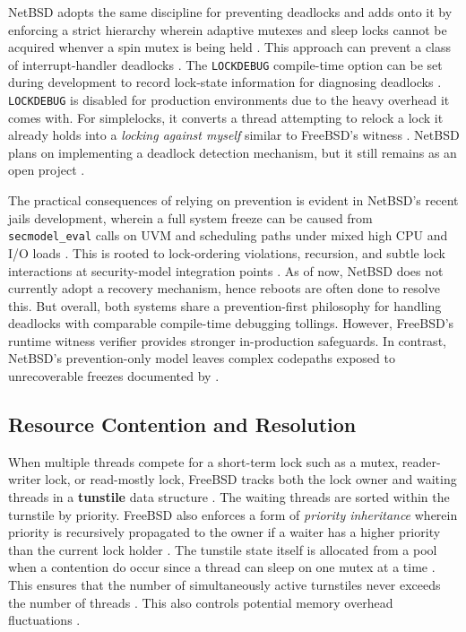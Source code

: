 NetBSD adopts the same discipline for preventing deadlocks and adds onto it by enforcing a strict hierarchy wherein adaptive mutexes
and sleep locks cannot be acquired whenver a spin mutex is being held \parencite{netbsd_mutex}. This approach can prevent a class
of interrupt-handler deadlocks \parencite{netbsd_mutex}. The \texttt{LOCKDEBUG} compile-time option can be set during development
to record lock-state information for diagnosing deadlocks \parencite{netbsd_lock}. \texttt{LOCKDEBUG} is disabled for production
environments due to the heavy overhead it comes with. For simplelocks, it converts a thread attempting
to relock a lock it already holds into a \textit{locking against myself} similar to FreeBSD's witness \parencite{netbsd_lockmgr}.
NetBSD plans on implementing a deadlock detection mechanism, but it still remains as an open project
\parencite{netbsd_deadlock_detector}.

The practical consequences of relying on prevention is evident in NetBSD's recent jails development, wherein a full system freeze
can be caused from \texttt{secmodel\_eval} calls on UVM and scheduling paths under mixed high CPU and I/O loads
\parencite{petermann_jails}. This is rooted to lock-ordering violations, recursion, and subtle lock interactions at security-model
integration points \parencite{petermann_jails}. As of now, NetBSD does not currently adopt a recovery mechanism, hence reboots
are often done to resolve this. But overall, both systems share a prevention-first philosophy for handling deadlocks with
comparable compile-time debugging tollings. However, FreeBSD's runtime witness verifier provides stronger in-production safeguards.
In contrast, NetBSD's prevention-only model leaves complex codepaths exposed to unrecoverable freezes documented by
\textcite{petermann_jails}.

\subsection{Resource Contention and Resolution} \label{resource-contention} %

When multiple threads compete for a short-term lock such as a mutex, reader-writer lock, or read-mostly lock, FreeBSD tracks both
the lock owner and waiting threads in a \textbf{tunstile} data structure \parencite{mckusick2014_process}. The waiting threads
are sorted within the turnstile by priority. FreeBSD also enforces a form of \textit{priority inheritance} wherein priority is
recursively propagated to the owner if a waiter has a higher priority than the current lock holder \parencite{mckusick2014_process}.
The tunstile state itself is allocated from a pool when a contention do occur since a thread can sleep on one mutex at a time
\parencite{mckusick2014_process}. This ensures that the number of simultaneously active turnstiles never exceeds the number of
threads \parencite{mckusick2014_process}. This also controls potential memory overhead fluctuations \parencite{mckusick2014_process}.

